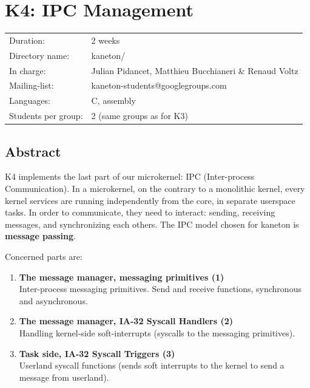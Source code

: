 
%
%

\chapter{K4: IPC Management}
\begin{tabular}{p{7cm}l}
Duration: & 2 weeks \\
Directory name: & kaneton/ \\
In charge: & Julian Pidancet, Matthieu Bucchianeri \& Renaud Voltz\\
Mailing-list: & kaneton-students@googlegroups.com \\
Languages: & C, assembly \\
Students per group: & 2 (same groups as for K3) \\
\end{tabular}

\section{Abstract}

K4 implements the last part of our microkernel: IPC (Inter-process
Communication). In a microkernel, on the contrary to a monolithic kernel,
every kernel services are running independently from the core, in separate
userspace tasks. In order to communicate, they need to interact: sending,
receiving messages, and synchronizing each others. The IPC model chosen for
kaneton is {\bf message passing}.

Concerned parts are:

\begin{enumerate}
  \item
    {\bf The message manager, messaging primitives (1)} \\
    Inter-process messaging primitives. Send and receive functions,
    synchronous and asynchronous.
  \item
    {\bf The message manager, IA-32 Syscall Handlers (2)}\\
    Handling kernel-side soft-interrupts (syscalls to the messaging
    primitives).
  \item
    {\bf Task side, IA-32 Syscall Triggers (3)}\\
    Userland syscall functions (sends soft interrupts to the kernel to
    send a message from userland).
\end{enumerate}


